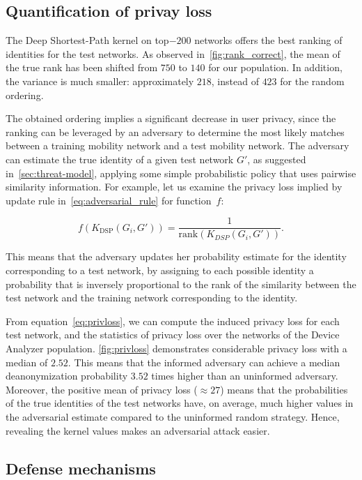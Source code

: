 \subsection{Quantification of privay loss}

The Deep Shortest-Path kernel on top$-200$ networks offers the best ranking of identities for the test networks.
As observed in~\cref{fig:rank_correct}, the mean of the true rank has been shifted from $ 750 $ to $ 140 $ for our population.
In addition, the variance is much smaller: approximately $ 218 $, instead of $ 423 $ for the random ordering.

The obtained ordering implies a significant decrease in user privacy, since the ranking can be leveraged by an adversary to determine the most likely matches between a training mobility network and a test mobility network.
The adversary can estimate the true identity of a given test network $ G' $, as suggested in~\cref{sec:threat-model}, applying some simple probabilistic policy that uses pairwise similarity information. For example, let us examine the privacy loss implied by update rule in~\eqref{eq:adversarial_rule} for  \mbox{function $ f$}:

\[
f\left(K_{\text{DSP}}(G_i, G')\right) =\frac{1}{\text{rank}\left(K_{DSP}(G_i, G')\right)}.
\label{eq:inverse_rank}
\]

This means that the adversary updates her probability estimate for the identity corresponding to a test network, by assigning to each possible identity a probability that is inversely proportional to the rank of the similarity between the test network and the training network corresponding to the identity.

From equation~\eqref{eq:privloss}, we can compute the induced privacy loss for each test network, and the statistics of privacy loss over the networks of the Device Analyzer population.
\cref{fig:privloss} demonstrates considerable privacy loss with a median of $ 2.52 $.
This means that the informed adversary can achieve a median deanonymization probability $3.52$ times higher than an uninformed adversary.
Moreover, the positive mean of privacy loss ($ {\approx  27}$) means that the probabilities of  the true identities of the test networks have, on average, much higher values in the adversarial estimate compared to the uninformed random strategy.
Hence, revealing the kernel values makes an adversarial attack easier.

\subsection{Defense mechanisms }

